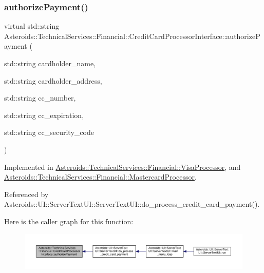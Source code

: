 \subsubsection{\texorpdfstring{authorize\+Payment()}{authorizePayment()}}
{\footnotesize\ttfamily virtual std\+::string Asteroids\+::\+Technical\+Services\+::\+Financial\+::\+Credit\+Card\+Processor\+Interface\+::authorize\+Payment (\begin{DoxyParamCaption}\item[{std\+::string}]{cardholder\+\_\+name,  }\item[{std\+::string}]{cardholder\+\_\+address,  }\item[{std\+::string}]{cc\+\_\+number,  }\item[{std\+::string}]{cc\+\_\+expiration,  }\item[{std\+::string}]{cc\+\_\+security\+\_\+code }\end{DoxyParamCaption})\hspace{0.3cm}{\ttfamily [pure virtual]}}



Implemented in \hyperlink{classAsteroids_1_1TechnicalServices_1_1Financial_1_1VisaProcessor_ac406ab9c118fd69ea85cf423f0cb69f5}{Asteroids\+::\+Technical\+Services\+::\+Financial\+::\+Visa\+Processor}, and \hyperlink{classAsteroids_1_1TechnicalServices_1_1Financial_1_1MastercardProcessor_a75069378c5945eb8b94b6a6c7842d814}{Asteroids\+::\+Technical\+Services\+::\+Financial\+::\+Mastercard\+Processor}.



Referenced by Asteroids\+::\+U\+I\+::\+Server\+Text\+U\+I\+::\+Server\+Text\+U\+I\+::do\+\_\+process\+\_\+credit\+\_\+card\+\_\+payment().

Here is the caller graph for this function\+:\nopagebreak
\begin{figure}[H]
\begin{center}
\leavevmode
\includegraphics[width=350pt]{classAsteroids_1_1TechnicalServices_1_1Financial_1_1CreditCardProcessorInterface_a605de1c4a264b4f9ae94ed13dd5fe1c0_icgraph}
\end{center}
\end{figure}
\mbox{\label{classAsteroids_1_1TechnicalServices_1_1Financial_1_1CreditCardProcessorInterface_a8dcf97d20a9de55d04e0f84b4a788f78}} 
